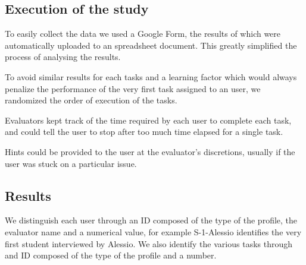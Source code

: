 \subsection{Execution of the study}
    To easily collect the data we used a Google Form, the results of which were automatically uploaded to an spreadsheet document. This greatly simplified the process of analysing the results.

    To avoid similar results for each tasks and a learning factor which would always penalize the performance of the very first task assigned to an user, we randomized the order of execution of the tasks.

    Evaluators kept track of the time required by each user to complete each task, and could tell the user to stop after too much time elapsed for a single task.

    Hints could be provided to the user at the evaluator's discretions, usually if the user was stuck on a particular issue.

\subsection{Results}

    We distinguish each user through an ID composed of the type of the profile, the evaluator name and a numerical value, for example S-1-Alessio identifies the very first student interviewed by Alessio. We also identify the various tasks through and ID composed of the type of the profile and a number.
